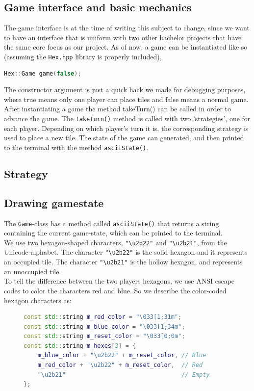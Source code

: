 \documentclass[a4paper]{article}
\begin{document}
\subsection{Game interface and basic mechanics}
The game interface is at the time of writing this subject to change, since we want to have an interface that is uniform with two other bachelor projects that have the same core focus as our project. As of now, a game can be instantiated like so (assuming the \texttt{Hex.hpp} library is properly included), \nonum \noframe
\begin{lstlisting}[language=C++]
Hex::Game game(false);
\end{lstlisting}
\setnum \setframe
The constructor argument is just a quick hack we made for debugging purposes, where true means only one player can place tiles and false means a normal game.
After instantiating a game the method takeTurn() can be called in order to advance the game.
The \texttt{takeTurn()} method is called with two 'strategies', one for each player. Depending on which player's turn it is, the corresponding strategy is used to place a new tile. The state of the game can generated, and then printed to the terminal with the method \texttt{asciiState()}.

\subsection{Strategy}



\subsection{Drawing gamestate}
The \texttt{Game}-class has a method called \texttt{asciiState()} that returns a string containing the current game-state, which can be printed to the terminal. \\
We use two hexagon-shaped characters, \texttt{"\textbackslash u2b22"} and \texttt{"\textbackslash u2b21"},  from the Unicode-alphabet. 
The character \texttt{"\textbackslash u2b22"} is the solid hexagon and it represents an occupied tile. The character \texttt{"\textbackslash u2b21"} is the hollow hexagon, and represents an unoccupied tile. \\
To tell the difference between the two players hexagons, we use ANSI escape codes to color the characters red and blue. So we describe the color-coded hexagon characters as: 
\begin{figure}[H]
\begin{lstlisting}[language=C++]
const std::string m_red_color = "\033[1;31m";
const std::string m_blue_color = "\033[1;34m";
const std::string m_reset_color = "\033[0;0m";
const std::string m_hexes[3] = {
    m_blue_color + "\u2b22" + m_reset_color, // Blue
    m_red_color + "\u2b22" + m_reset_color,  // Red
    "\u2b21"                                 // Empty
};
\end{lstlisting}
\end{figure}
\end{document}
